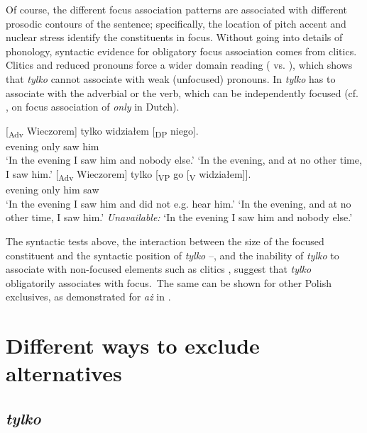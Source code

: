 \documentclass[output=paper,colorlinks,citecolor=brown]{langscibook}
\begin{document}
\noindent Of course, the different focus association patterns are associated with different prosodic contours of the sentence; specifically, the location of pitch accent and nuclear stress identify the constituents in focus. Without going into details of phonology, syntactic evidence for obligatory focus association comes from clitics. Clitics and reduced pronouns force a wider domain reading ( vs. ), which shows that \textit{tylko} cannot associate with weak (unfocused) pronouns. In  \textit{tylko} has to associate with the adverbial or the verb, which can be independently focused (cf. \citealt{hoeksemazwarts91}, \citealt{beaverclark08} on focus association of \textit{only} in Dutch).

\ea\label{ex:tom:23}
\ea\label{ex:tom:23a}  
\gll {}[\textsubscript{Adv} Wieczorem] tylko widziałem [\textsubscript{DP} niego].\\ 
{} evening only saw {} him\\  
\ea `In the evening I saw him and nobody else.’
\ex `In the evening, and at no other time, I saw him.’
\z 
\ex\label{ex:tom:23b}  
\gll {}[\textsubscript{Adv} Wieczorem]   tylko [\textsubscript{VP} go [\textsubscript{V} widziałem]].\\
{} evening  only {} him {} saw\\
\ea `In the evening I saw him and did not e.g. hear him.’
\ex `In the evening, and at no other time, I saw him.’
\ex \textit{Unavailable:} ‘In the evening I saw him and nobody else.’
\z 
\z 
\z 

\noindent The syntactic tests above, the interaction between the size of the focused constituent and the syntactic position of \textit{tylko} --, and the inability of \textit{tylko} to associate with non-focused elements such as clitics , suggest that \textit{tylko} obligatorily associates with focus.~The same can be shown for other Polish exclusives, as demonstrated for \textit{aż} in \citet{tomaszewicz12,tomaszewicz13,tomaszewicz13a}.

\section{Different ways to exclude alternatives}
\label{sec:tom:4}

\subsection{\textit{tylko}}
\label{sec:tom:4.1}
\end{document}
